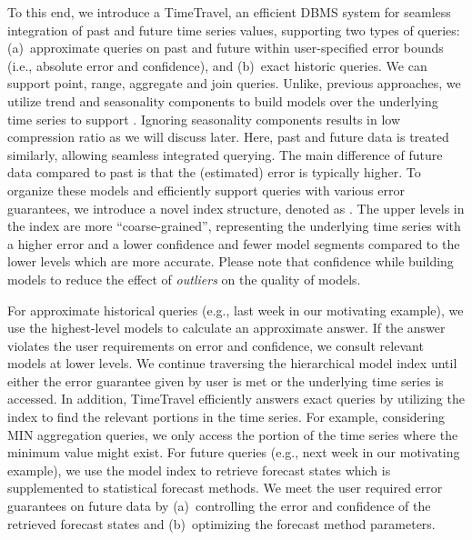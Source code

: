 To this end, we introduce a  TimeTravel, an efficient DBMS system for seamless integration  of past and future time series values, supporting two types of queries:
(a)~approximate queries on past and future within user-specified error bounds (i.e., absolute error and confidence), and (b)~exact historic queries.
We can support point, range, aggregate and join queries.
Unlike, previous approaches, we utilize trend and seasonality components to build models over the underlying time series to support . Ignoring seasonality components results in low compression ratio as we will discuss later.  Here, past and future data is treated similarly, allowing seamless integrated querying. The main difference of future data compared to past is that the (estimated) error is typically higher.
To organize these models and efficiently support queries with various error guarantees, we introduce a novel index structure, denoted as {\em \LN}.  The upper levels in the index are more ``coarse-grained'', representing 
the underlying time series with a higher error and a lower confidence and fewer model segments compared to the lower levels which are more accurate. Please note that confidence while building models to reduce the effect of  {\it outliers} on the quality of models.

For approximate historical queries (e.g., last week in our motivating example), we use the highest-level models to calculate an approximate answer. If the  answer violates the user requirements on error and confidence, we consult relevant models at lower levels.  We continue traversing the hierarchical model index until either the error guarantee given by user is met or the underlying time series is accessed.
In addition, TimeTravel efficiently answers exact queries by utilizing the index  to find the relevant portions in the time series. For example, considering MIN aggregation queries, we only access the portion of the time series where the minimum value might exist. 
For future queries (e.g., next week in our motivating example), we use the model index to retrieve forecast states which is supplemented to  statistical forecast methods.
We meet the user required error guarantees on future data by (a)~controlling the error and confidence of the  retrieved forecast states and (b)~optimizing the forecast method parameters. 

